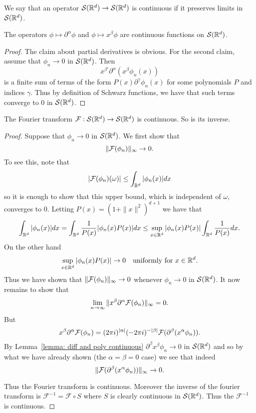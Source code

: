 \documentclass[twoside, a4paper, 10pt]{amsart}
\begin{document}
We say that an operator $\mathcal{S}(\mathbb{R}^d) \to \mathcal{S}(\mathbb{R}^d)$ is continuous if it preserves limits in $\mathcal{S}(\mathbb{R}^d)$.

\begin{lemma}\label{lemma: diff and poly continuous} The operators $\phi \mapsto \partial^{\alpha}\phi$ and $\phi \mapsto x^{\beta}\phi$ are continuous functions on $\mathcal{S}(\mathbb{R}^d)$.

\end{lemma}

\begin{proof} The claim about partial derivatives is obvious. For the second claim, assume that $\phi_n \to 0$ in $\mathcal{S}(\mathbb{R}^d)$. Then $$x^{\beta'} \partial^{\alpha} (x^{\beta} \phi_n(x))$$ is a finite sum of terms of the form $P(x)\partial^{\gamma}\phi_n(x)$ for some polynomials $P$ and indices $\gamma$. Thus by definition of Schwarz functions, we have that such terms converge to $0$ in $\mathcal{S}(\mathbb{R}^d)$. \end{proof}

\begin{prop} The Fourier transform $\mathcal{F}:\mathcal{S}(\mathbb{R}^d) \to \mathcal{S}(\mathbb{R}^d)$ is continuous. So is its inverse.

\end{prop}

\begin{proof} Suppose that $\phi_n \to 0$ in $\mathcal{S}(\mathbb{R}^d)$. We first show that $$\| \mathcal{F}(\phi_n)\|_{\infty} \to 0.$$ To see this, note that $$|\mathcal{F}(\phi_n) (\omega)| \leq \int_{\mathbb{R}^d} |\phi_n(x)| dx$$ so it is enough to show that this upper bound, which is independent of $\omega$, converges to $0$. Letting $P(x) = (1 + \|x\|^2)^{d+1}$ we have that $$\int_{\mathbb{R}^d}|\phi_n(x)| dx = \int_{\mathbb{R}^d} \frac{1}{P(x)} |\phi_n(x)P(x)| dx \leq \sup_{x \in \mathbb{R}^d} |\phi_n(x)P(x)|  \int_{\mathbb{R}^d} \frac{1}{P(x)} dx.$$ On the other hand $$\sup_{x \in \mathbb{R}^d} |\phi_n(x)P(x)| \to 0 \quad\text{uniformly for } x \in \mathbb{R}^d.$$ Thus we have shown that $\|\mathcal{F}(\phi_n)\|_{\infty} \to 0$ whenever $\phi_n \to 0$ in $\mathcal{S}(\mathbb{R}^d)$. It now remains to show that $$\lim_{n \to \infty} \|x^{\beta} \partial^{\alpha} \mathcal{F}(\phi_n)\|_{\infty} = 0.$$ But $$x^{\beta} \partial^{\alpha} \mathcal{F}(\phi_n) = (2\pi i)^{|\alpha|}(-2\pi i)^{-|\beta|} \mathcal{F}(\partial^{\beta} (x^{\alpha} \phi_n)).$$ By Lemma~\ref{lemma: diff and poly continuous} $\partial^{\beta} x^{\beta} \phi_n \to 0$ in $\mathcal{S}(\mathbb{R}^d)$ and so by what we have already shown (the $\alpha = \beta = 0$ case) we see that indeed $$\|\mathcal{F}(\partial^{\beta} (x^{\alpha} \phi_n))\|_{\infty} \to 0.$$

Thus the Fourier transform is continuous. Moreover the inverse of the fourier transform is $\mathcal{F}^{-1} = \mathcal{F} \circ S$ where $S$ is clearly continuous in $\mathcal{S}(\mathbb{R}^d)$. Thus the $\mathcal{F}^{-1}$ is continuous. \end{proof}
\end{document}
